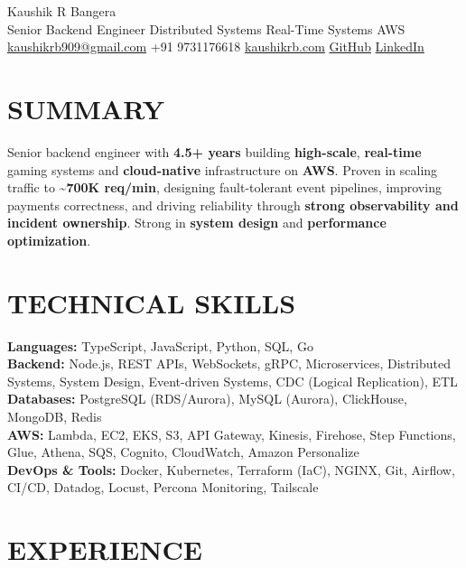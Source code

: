 \documentclass[a4paper,10pt]{article}
\begin{document}
\RaggedRight

{\fontsize{26}{30}\selectfont Kaushik R Bangera}\\[2pt]
{\color{accent}\large Senior Backend Engineer \textbar{} Distributed Systems \textbar{} Real-Time Systems \textbar{} AWS}\\[2pt]
\href{mailto:kaushikrb909@gmail.com}{kaushikrb909@gmail.com} \textbar{} +91 9731176618 \textbar{} \href{https://kaushikrb.com/?utm_source=resume}{kaushikrb.com} \textbar{} \href{https://github.com/NeuronEnix}{GitHub} \textbar{} \href{https://www.linkedin.com/in/kaushik-r-bangera/}{LinkedIn}

\section*{SUMMARY}
Senior backend engineer with \textbf{4.5+ years} building \textbf{high-scale}, \textbf{real-time} gaming systems and \textbf{cloud-native} infrastructure on \textbf{AWS}. Proven in scaling traffic to \textbf{\textasciitilde{}700K req/min}, designing fault-tolerant event pipelines, improving payments correctness, and driving reliability through \textbf{strong observability and incident ownership}. Strong in \textbf{system design} and \textbf{performance optimization}.

\section*{TECHNICAL SKILLS}
\textbf{Languages:} TypeScript, JavaScript, Python, SQL, Go\\
\textbf{Backend:} Node.js, REST APIs, WebSockets, gRPC, Microservices, Distributed Systems, System Design, Event-driven Systems, CDC (Logical Replication), ETL\\
\textbf{Databases:} PostgreSQL (RDS/Aurora), MySQL (Aurora), ClickHouse, MongoDB, Redis\\
\textbf{AWS:} Lambda, EC2, EKS, S3, API Gateway, Kinesis, Firehose, Step Functions, Glue, Athena, SQS, Cognito, CloudWatch, Amazon Personalize\\
\textbf{DevOps \& Tools:} Docker, Kubernetes, Terraform (IaC), NGINX, Git, Airflow, CI/CD, Datadog, Locust, Percona Monitoring, Tailscale

\section*{EXPERIENCE}
\end{document}
